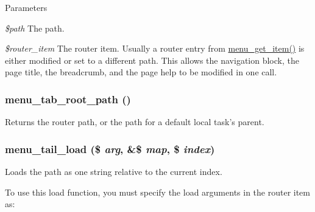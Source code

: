 \begin{DoxyParams}{Parameters}
\item[{\em \$path}]The path. \item[{\em \$router\_\-item}]The router item. Usually a router entry from \hyperlink{group__menu_ga855b1ca6ef9e44eb6107a2b9d0f581df}{menu\_\-get\_\-item()} is either modified or set to a different path. This allows the navigation block, the page title, the breadcrumb, and the page help to be modified in one call. \end{DoxyParams}
\hypertarget{group__menu_gacf647362fc7151bbaa1dbe5568a0b6b5}{
\subsubsection[{menu\_\-tab\_\-root\_\-path}]{\setlength{\rightskip}{0pt plus 5cm}menu\_\-tab\_\-root\_\-path ()}}
\label{group__menu_gacf647362fc7151bbaa1dbe5568a0b6b5}
Returns the router path, or the path for a default local task's parent. \hypertarget{group__menu_ga6ed894e4c0813549a74b46c5a62e1c25}{
\subsubsection[{menu\_\-tail\_\-load}]{\setlength{\rightskip}{0pt plus 5cm}menu\_\-tail\_\-load (\$ {\em arg}, \/  \&\$ {\em map}, \/  \$ {\em index})}}
\label{group__menu_ga6ed894e4c0813549a74b46c5a62e1c25}
Loads the path as one string relative to the current index.

To use this load function, you must specify the load arguments in the router item as: 



